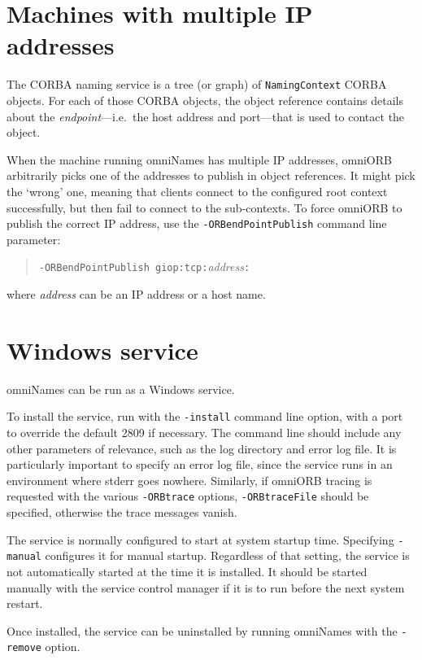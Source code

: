 \documentclass[a4paper,11pt,twoside]{article}
\newcommand{\cmdline}[1]{\texttt{#1}}
\begin{document}
\section{Machines with multiple IP addresses}

The CORBA naming service is a tree (or graph) of \verb|NamingContext|
CORBA objects. For each of those CORBA objects, the object reference
contains details about the \emph{endpoint}---i.e.\ the host address
and port---that is used to contact the object.

When the machine running omniNames has multiple IP addresses, omniORB
arbitrarily picks one of the addresses to publish in object
references. It might pick the `wrong' one, meaning that clients
connect to the configured root context successfully, but then fail to
connect to the sub-contexts. To force omniORB to publish the correct
IP address, use the \verb|-ORBendPointPublish| command line parameter:

\begin{quote}
\cmdline{-ORBendPointPublish giop:tcp:}\textit{address}\cmdline{:}
\end{quote}

\noindent where \textit{address} can be an IP address or a host name.

\section{Windows service}

omniNames can be run as a Windows service.

To install the service, run with the \cmdline{-install} command line
option, with a port to override the default 2809 if necessary. The
command line should include any other parameters of relevance, such as
the log directory and error log file. It is particularly important to
specify an error log file, since the service runs in an environment
where stderr goes nowhere. Similarly, if omniORB tracing is requested
with the various \cmdline{-ORBtrace} options, \cmdline{-ORBtraceFile}
should be specified, otherwise the trace messages vanish.

The service is normally configured to start at system startup time.
Specifying \cmdline{-manual} configures it for manual startup.
Regardless of that setting, the service is not automatically started
at the time it is installed. It should be started manually with the
service control manager if it is to run before the next system
restart.

Once installed, the service can be uninstalled by running omniNames
with the \cmdline{-remove} option.
\end{document}
